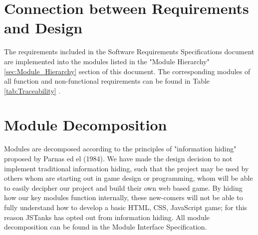 \documentclass{article}
\begin{document}
\section{Connection between Requirements and Design}
The requirements included in the Software Requirements Specifications document are implemented into the modules listed in the "Module Hierarchy" \ref{sec:Module_Hierarchy} section of this document.
The corresponding modules of all function and non-functional requirements can be found in Table \ref{tab:Traceability}  .


\section{Module Decomposition}
Modules are decomposed according to the principles of "information hiding" proposed by Parnas ed el (1984). We have made the design decision to not implement traditional information hiding, such that the project may be used by others whom are starting out in game design or programming, whom will be able to easily decipher our project and build their own web based game. By hiding how our key modules function internally, these new-comers will not be able to fully understand how to develop a basic HTML, CSS, JavaScript game; for this reason JSTanks has opted out from information hiding. All module decomposition can be found in the Module Interface Specification. 
\end{document}
